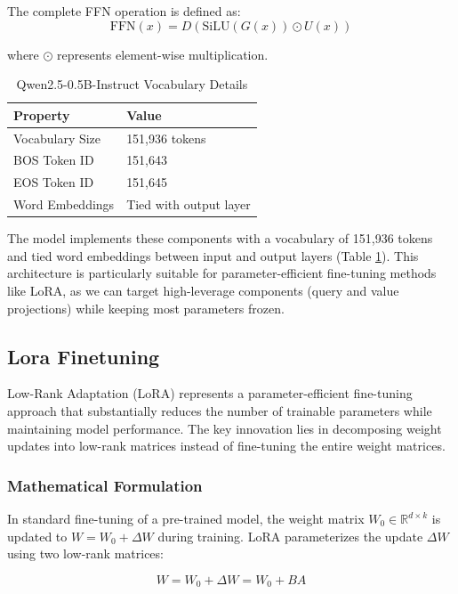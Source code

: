 \documentclass{article}
\begin{document}
The complete FFN operation is defined as:
\begin{equation}
\text{FFN}(x) = D(\text{SiLU}(G(x)) \odot U(x))
\end{equation}

\noindent where $\odot$ represents element-wise multiplication.

\begin{table}[H]
\centering
\begin{tabular}{@{}ll@{}}
\hline
\textbf{Property} & \textbf{Value} \\
\hline
Vocabulary Size & 151,936 tokens \\
BOS Token ID & 151,643 \\
EOS Token ID & 151,645 \\
Word Embeddings & Tied with output layer \\
\hline
\end{tabular}
\caption{Qwen2.5-0.5B-Instruct Vocabulary Details}
\label{tab:qwen25-vocab}
\end{table}

The model implements these components with a vocabulary of 151,936 tokens and tied word embeddings between input and output layers (Table \ref{tab:qwen25-vocab}). This architecture is particularly suitable for parameter-efficient fine-tuning methods like LoRA, as we can target high-leverage components (query and value projections) while keeping most parameters frozen.
\subsection*{Lora Finetuning}
Low-Rank Adaptation (LoRA) \cite{hu2022lora} represents a parameter-efficient fine-tuning approach that substantially reduces the number of trainable parameters while maintaining model performance. The key innovation lies in decomposing weight updates into low-rank matrices instead of fine-tuning the entire weight matrices.

\subsubsection*{Mathematical Formulation}

In standard fine-tuning of a pre-trained model, the weight matrix $W_0 \in \mathbb{R}^{d \times k}$ is updated to $W = W_0 + \Delta W$ during training. LoRA parameterizes the update $\Delta W$ using two low-rank matrices:

\begin{equation}
W = W_0 + \Delta W = W_0 + BA
\end{equation}
\end{document}
